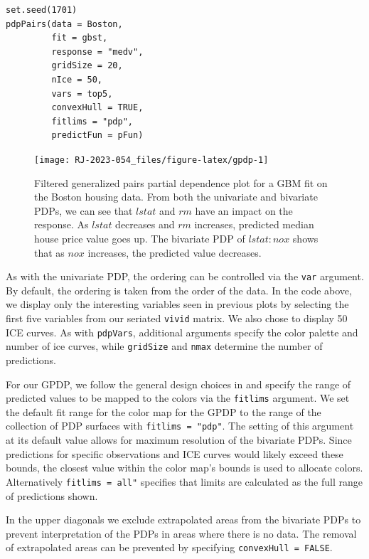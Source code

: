 \begin{verbatim}
set.seed(1701)
pdpPairs(data = Boston,
         fit = gbst,
         response = "medv",
         gridSize = 20,
         nIce = 50,
         vars = top5,
         convexHull = TRUE,
         fitlims = "pdp",
         predictFun = pFun)
\end{verbatim}

\begin{figure}

{\centering \texttt{[image: RJ-2023-054\_files/figure-latex/gpdp-1]} 

}

\caption{Filtered generalized pairs partial dependence plot for a GBM fit on the Boston housing data. From both the univariate and bivariate PDPs, we can see that $lstat$ and $rm$ have an impact on the response. As $lstat$ decreases and $rm$ increases, predicted median house price value goes up. The bivariate PDP of $lstat:nox$ shows that as $nox$ increases, the predicted value decreases.}\label{fig:gpdp}
\end{figure}

As with the univariate PDP, the ordering can be controlled via the \texttt{var} argument. By default, the ordering is taken from the order of the data. In the code above, we display only the interesting variables seen in previous plots by selecting the first five variables from our seriated \texttt{vivid} matrix. We also chose to display 50 ICE curves. As with \texttt{pdpVars}, additional arguments specify the color palette and number of ice curves, while \texttt{gridSize} and \texttt{nmax} determine the number of predictions.

For our GPDP, we follow the general design choices in  and specify the range of predicted values to be mapped to the colors via the \texttt{fitlims} argument. We set the default fit range for the color map for the GPDP to the range of the collection of PDP surfaces with \texttt{fitlims\ =\ "pdp"}. The setting of this argument at its default value allows for maximum resolution of the bivariate PDPs. Since predictions for specific observations and ICE curves would likely exceed these bounds, the closest value within the color map's bounds is used to allocate colors. Alternatively \texttt{fitlims\ =\ \textquotesingle{}all"} specifies that limits are calculated as the full range of predictions shown.

In the upper diagonals we exclude extrapolated areas from the bivariate PDPs to prevent interpretation of the PDPs in areas where there is no data. The removal of extrapolated areas can be prevented by specifying \texttt{convexHull\ =\ FALSE}.

